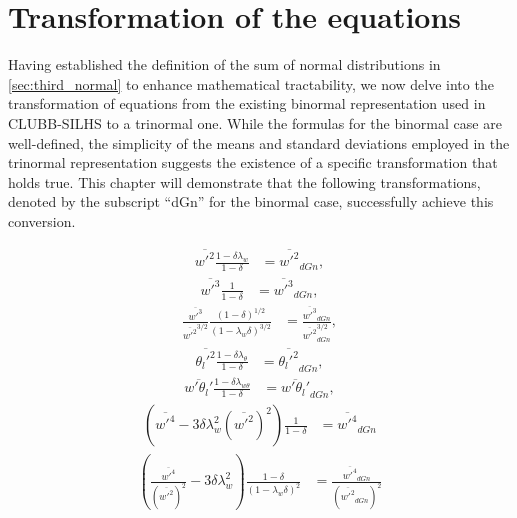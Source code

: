 \section{Transformation of the equations}\label{sec:transformationequations}

Having established the definition of the sum of normal distributions in \cref{sec:third_normal} to enhance mathematical tractability, we now delve into the transformation of equations from the existing binormal representation used in CLUBB-SILHS\cite{larson2022clubbsilhs} to a trinormal one.
While the formulas for the binormal case are well-defined, the simplicity of the means and standard deviations employed in the trinormal representation suggests the existence of a specific transformation that holds true.
This chapter will demonstrate that the following transformations, denoted by the subscript \enquote{dGn} for the binormal case, successfully achieve this conversion.

\begin{align}
    \overline{w'^2} \frac{1 - \delta\lambda_w}{1 - \delta}
    &= \overline{w'^2}_{dGn}, \label{eq:w_prime_2_transform}
\end{align}
\begin{align}
    \overline{w'^3} \frac{1}{1 - \delta}
    &= \overline{w'^3}_{dGn}, \label{eq:w_prime_3_transform}
\end{align}
\begin{align}
    \frac{\overline{w'^3}}{\overline{w'^2}^{3/2}} \frac{(1 - \delta)^{1/2}}{(1 - \lambda_w\delta)^{3/2}}
    &= \frac{\overline{w'^3}_{dGn}}{\overline{w'^2}_{dGn}^{3/2}}, \label{eq:w_prime_3_div_w_prime_2_transform}
\end{align}
\begin{align}
    \overline{\theta_l'^2} \frac{1 - \delta\lambda_\theta}{1 - \delta}
    &= \overline{\theta_l'^2}_{dGn}, \label{eq:theta_l_prime_transform}
\end{align}
\begin{align}
    \overline{w'\theta_l'} \frac{1 - \delta\lambda_{w\theta}}{1 - \delta}
    &= \overline{w'\theta_l'}_{dGn}, \label{eq:w_prime_theta_l_prime_transform}
\end{align}
\begin{align}
    \left(\overline{w'^4} - 3\delta\lambda_w^2 \left(\overline{w'^2}\right)^2\right) \frac{1}{1 - \delta}
    &= \overline{w'^4}_{dGn} \label{eq:w_prime_4_transform}
\end{align}
\begin{align}
    \left(\frac{\overline{w'^4}}{(\overline{w'^2})^2} - 3\delta\lambda_w^2 \right) \frac{1 - \delta}{(1 - \lambda_w\delta)^2}
    &= \frac{\overline{w'^4}_{dGn}}{(\overline{w'^2}_{dGn})^2} \label{eq:w_prime_4_div_w_prime_2_transform}
\end{align}

